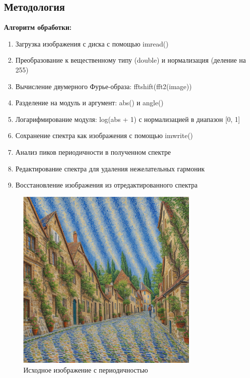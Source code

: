 \subsection*{Методология}

\textbf{Алгоритм обработки:}
\begin{enumerate}
    \item Загрузка изображения с диска с помощью imread()
    \item Преобразование к вещественному типу (double) и нормализация (деление на 255)
    \item Вычисление двумерного Фурье-образа: fftshift(fft2(image))
    \item Разделение на модуль и аргумент: abs() и angle()
    \item Логарифмирование модуля: log(abs + 1) с нормализацией в диапазон [0, 1]
    \item Сохранение спектра как изображения с помощью imwrite()
    \item Анализ пиков периодичности в полученном спектре
    \item Редактирование спектра для удаления нежелательных гармоник
    \item Восстановление изображения из отредактированного спектра
\end{enumerate}

\begin{figure}[H]
    \centering
    \includegraphics[width=0.8\textwidth]{images/task1/original_image.png}
    \caption{Исходное изображение с периодичностью}
    \label{fig:original_periodic}
\end{figure}

